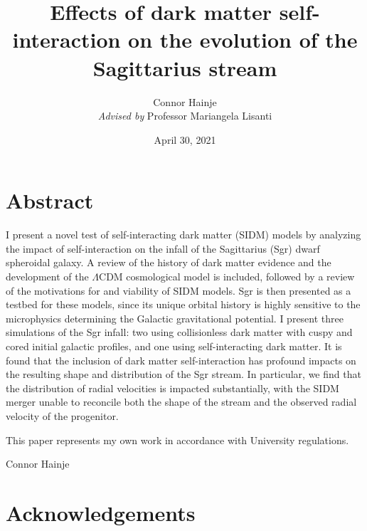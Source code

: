 \documentclass[12pt,oneside]{book}
\title{Effects of dark matter self-interaction on the evolution of the Sagittarius stream}
\author{Connor Hainje\\\textit{Advised by} Professor Mariangela Lisanti}
\date{April 30, 2021}
\begin{document}
\maketitle

\onehalfspacing
{}

\chapter*{Abstract}

I present a novel test of self-interacting dark matter (SIDM) models by
analyzing the impact of self-interaction on the infall of the Sagittarius
(Sgr) dwarf spheroidal galaxy.  A review of the history of dark matter
evidence and the development of the $\Lambda$CDM cosmological model is
included, followed by a review of the motivations for and viability of SIDM
models. Sgr is then presented as a testbed for these models, since its unique
orbital history is highly sensitive to the microphysics determining the Galactic
gravitational potential. I present three simulations of the Sgr infall: two
using collisionless dark matter with cuspy and cored initial galactic profiles,
and one using self-interacting dark matter.  It is found that the inclusion of
dark matter self-interaction has profound impacts on the resulting shape and
distribution of the Sgr stream.  In particular, we find that the distribution of
radial velocities is impacted substantially, with the SIDM merger unable to
reconcile both the shape of the stream and the observed radial velocity of the
progenitor. 

\vspace{0.25in}
This paper represents my own work in accordance with University regulations.

\vspace{0.35in}
\hspace{3.5in}Connor Hainje

\newpage

\newpage

\singlespacing
\tableofcontents 
\newpage

\onehalfspacing








\setcounter{secnumdepth}{-1}
\chapter{Acknowledgements}
\end{document}
